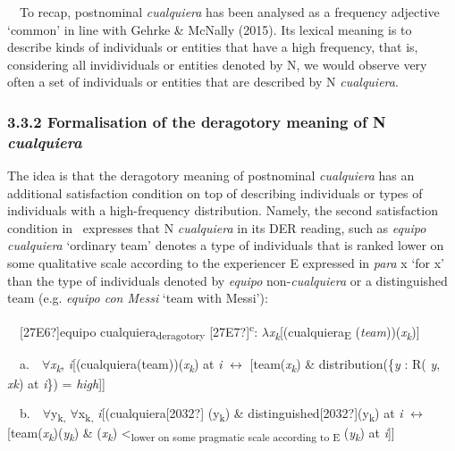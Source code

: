 \begin{styleStandard}
\ \ To recap, postnominal \textit{cualquiera} has been analysed as a frequency adjective ‘common’ in line with Gehrke \& McNally (2015). Its lexical meaning is to describe kinds of individuals or entities that have a high frequency, that is, considering all invidividuals or entities denoted by N, we would observe very often a set of individuals or entities that are described by N\textit{ cualquiera}. 
\end{styleStandard}

\subsubsection[3.3.2 Formalisation of the deragotory meaning of N cualquiera]{\textbf{3.3.2 Formalisation of the deragotory meaning of N }\textbf{\textit{cualquiera}}}
\begin{styleStandard}
The idea is that the deragotory meaning of postnominal \textit{cualquiera} has an additional satisfaction condition on top of describing individuals or types of individuals with a high-frequency distribution. Namely, the second satisfaction condition in \ expresses that N\textit{ cualquiera} in its DER reading, such as \textit{equipo cualquiera} ‘ordinary team’ denotes a type of individuals that is ranked lower on some qualitative scale according to the experiencer E expressed in \textit{para }x ‘for x’ than the type of individuals denoted by \textit{equipo} non-\textit{cualquiera} or a distinguished team (e.g. \textit{equipo con Messi} ‘team with Messi’):
\end{styleStandard}

\begin{styleStandard}
\label{bkm:Ref58094203}\ \ [27E6?]equipo cualquiera\textsubscript{deragotory }[27E7?]\textsuperscript{c}: $\lambda $\textit{x}\textit{\textsubscript{k}}[(cualquiera\textsubscript{E} (\textit{team}))(\textit{x}\textit{\textsubscript{k}})]
\end{styleStandard}

\begin{styleStandard}
\ \ a.\ \ ${\forall}$\textit{x}\textit{\textsubscript{k}}, \textit{i}[(cualquiera(team))(\textit{x}\textit{\textsubscript{k}}) at \textit{i }$\leftrightarrow $ [team(\textit{x}\textit{\textsubscript{k}}) \& distribution(\{\textit{y }: R( \textit{y}, \textit{xk}) at \textit{i}\}) = \textit{high}]]
\end{styleStandard}

\begin{styleStandard}
\ \ b.\ \ ${\forall}$y\textsubscript{k, }${\forall}$x\textsubscript{k, }\textit{i}[(cualquiera[2032?] (y\textsubscript{k}) \& distinguished[2032?](y\textsubscript{k}) at \textit{i} $\leftrightarrow $ [team(\textit{x}\textit{\textsubscript{k}})(\textit{y}\textit{\textsubscript{k}}) \& (\textit{x}\textit{\textsubscript{k}}) {\textless}\textsubscript{lower on some pragmatic scale according to E }(\textit{y}\textit{\textsubscript{k}}) at \textit{i}]]
\end{styleStandard}

